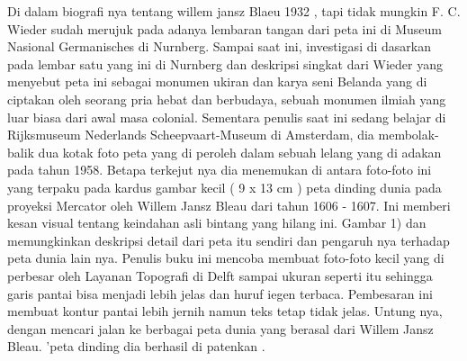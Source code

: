 Di dalam biografi nya tentang willem jansz Blaeu 1932 , tapi tidak mungkin F. C. Wieder sudah merujuk pada adanya lembaran tangan dari 
peta ini di Museum Nasional Germanisches di Nurnberg. Sampai saat ini, investigasi di dasarkan pada lembar satu yang ini di Nurnberg dan deskripsi singkat dari Wieder yang menyebut peta ini sebagai monumen ukiran 
dan karya seni Belanda yang di ciptakan oleh seorang pria hebat dan berbudaya, sebuah monumen ilmiah yang luar biasa dari awal masa colonial. 
Sementara penulis saat ini sedang belajar di Rijksmuseum Nederlands Scheepvaart-Museum di Amsterdam, 
dia membolak-balik dua kotak foto peta yang di peroleh dalam sebuah lelang yang di adakan pada tahun 1958. 
Betapa terkejut nya dia menemukan di antara foto-foto ini yang terpaku pada kardus gambar kecil ( 9 x 13 cm ) 
peta dinding dunia pada proyeksi Mercator oleh Willem Jansz Bleau dari tahun 1606 - 1607. 
Ini memberi kesan visual tentang keindahan asli bintang yang hilang ini. 
Gambar 1) dan memungkinkan deskripsi detail dari peta itu sendiri dan pengaruh nya terhadap peta dunia lain nya. 
Penulis buku ini mencoba membuat foto-foto kecil yang di perbesar oleh Layanan Topografi di Delft sampai ukuran seperti itu 
sehingga garis pantai bisa menjadi lebih jelas dan huruf iegen terbaca. 
Pembesaran ini membuat kontur pantai lebih jernih namun teks tetap tidak jelas. 
Untung nya, dengan mencari jalan ke berbagai peta dunia yang berasal dari Willem Jansz Bleau. 'peta dinding dia berhasil di patenkan \cite{campbell1976descriptive}.

